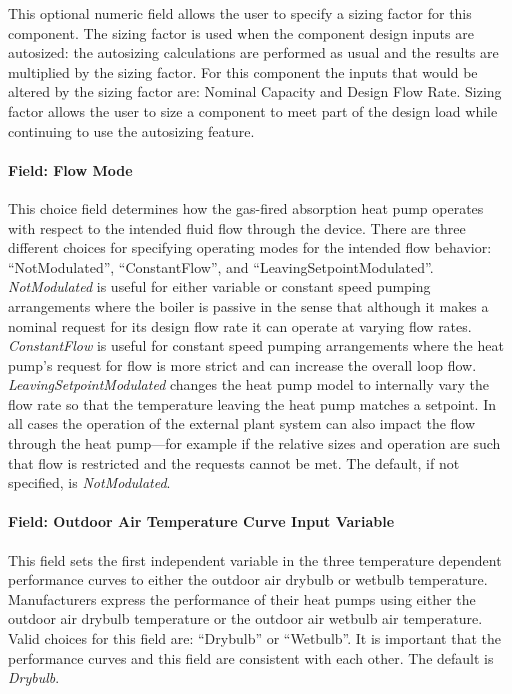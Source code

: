 This optional numeric field allows the user to specify a sizing factor for this component. The sizing factor is used when the component design inputs are autosized: the autosizing calculations are performed as usual and the results are multiplied by the sizing factor. For this component the inputs that would be altered by the sizing factor are: Nominal Capacity and Design Flow Rate. Sizing factor allows the user to size a component to meet part of the design load while continuing to use the autosizing feature.

\paragraph{Field: Flow Mode}

This choice field determines how the gas-fired absorption heat pump operates with respect to the intended fluid flow through the device. There are three different choices for specifying operating modes for the intended flow behavior: ``NotModulated'', ``ConstantFlow'', and ``LeavingSetpointModulated''. \emph{NotModulated} is useful for either variable or constant speed pumping arrangements where the boiler is passive in the sense that although it makes a nominal request for its design flow rate it can operate at varying flow rates. \emph{ConstantFlow} is useful for constant speed pumping arrangements where the heat pump's request for flow is more strict and can increase the overall loop flow. \emph{LeavingSetpointModulated} changes the heat pump model to internally vary the flow rate so that the temperature leaving the heat pump matches a setpoint. In all cases the operation of the external plant system can also impact the flow through the heat pump---for example if the relative sizes and operation are such that flow is restricted and the requests cannot be met. The default, if not specified, is \emph{NotModulated}.

\paragraph{Field: Outdoor Air Temperature Curve Input Variable}

This field sets the first independent variable in the three temperature dependent performance curves to either the outdoor air drybulb or wetbulb temperature. Manufacturers express the performance of their heat pumps using either the outdoor air drybulb temperature or the outdoor air wetbulb air temperature. Valid choices for this field are: ``Drybulb'' or ``Wetbulb''. It is important that the performance curves and this field are consistent with each other. The default is \emph{Drybulb}.

